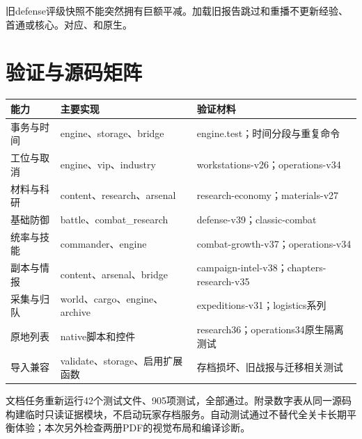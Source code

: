 旧defense评级快照不能突然拥有巨额平减。加载旧报告跳过和重播不更新经验、首通或核心。对应、和原生。

\Needspace{95mm}
\section{验证与源码矩阵}
\begin{small}\begin{longtable}{@{}P{32mm}P{58mm}P{54mm}@{}}
\toprule 能力 & 主要实现 & 验证材料\\\midrule\endhead
事务与时间 & engine、storage、bridge & engine.test；时间分段与重复命令\\
工位与取消 & engine、vip、industry & workstations-v26；operations-v34\\
材料与科研 & content、research、arsenal & research-economy；materials-v27\\
基础防御 & battle、combat\_research & defense-v39；classic-combat\\
统率与技能 & commander、engine & combat-growth-v37；operations-v34\\
副本与情报 & content、arsenal、bridge & campaign-intel-v38；chapters-research-v35\\
采集与归队 & world、cargo、engine、archive & expeditions-v31；logistics系列\\
原地列表 & native脚本和控件 & research36；operations34原生隔离测试\\
导入兼容 & validate、storage、启用扩展函数 & 存档损坏、旧战报与迁移相关测试\\
\bottomrule\end{longtable}\end{small}

文档任务重新运行42个测试文件、905项测试，全部通过。附录数字表从同一源码构建临时只读证据模块，不启动玩家存档服务。自动测试通过不替代全关卡长期平衡体验；本次另外检查两册PDF的视觉布局和编译诊断。
